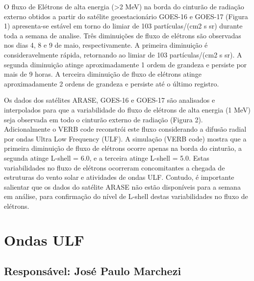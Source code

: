 \documentclass[a4paper, 10pt]{article}
\begin{document}
                     O fluxo de Elétrons de alta energia (>2 MeV) na borda do cinturão de radiação externo obtidos a partir do satélite geoestacionário GOES-16 e GOES-17 (Figura 1) apresenta-se estável em torno do limiar de 103 partículas/(cm2 s sr) durante toda a semana de analise. Três diminuições de fluxo de elétrons são observadas nos dias 4, 8 e 9 de maio, respectivamente. A primeira diminuição é consideravelmente rápida, retornando ao limiar de 103 partículas/(cm2 s sr). A segunda diminuição atinge aproximadamente 1 ordem de grandeza e persiste por mais de 9 horas. A terceira diminuição de fluxo de elétrons atinge aproximadamente 2 ordens de grandeza e persiste até o último registro. 

Os dados dos satélites ARASE, GOES-16 e GOES-17 são analisados e interpolados para que a variabilidade do fluxo de elétrons de alta energia (1 MeV) seja observada em todo o cinturão externo de radiação (Figura 2). Adicionalmente o VERB code reconstrói este fluxo considerando a difusão radial por ondas Ultra Low Frequency (ULF). A simulação (VERB code) mostra que a primeira diminuição de fluxo de elétrons ocorre apenas na borda do cinturão, a segunda atinge L-shell = 6.0, e a terceira atinge L-shell = 5.0. Estas variabilidades no fluxo de elétrons ocorreram concomitantes a chegada de estruturas do vento solar e atividades de ondas ULF. Contudo, é importante salientar que os dados do satélite ARASE não estão disponíveis para a semana em análise, para confirmação do nível de L-shell destas variabilidades no fluxo de elétrons.



\section{Ondas ULF} 
 \subsection{Responsável: José Paulo Marchezi} 
 
\end{document}
